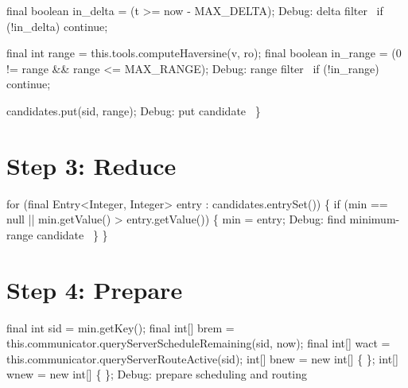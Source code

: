   final boolean in_delta = (t >= now - MAX_DELTA);
  \LA{}Debug: delta filter~{\nwtagstyle{}}\RA{}
  if (!in_delta)
    continue;

  final int range = this.tools.computeHaversine(v, ro);
  final boolean in_range = (0 != range && range <= MAX_RANGE);
  \LA{}Debug: range filter~{\nwtagstyle{}}\RA{}
  if (!in_range)
    continue;

  candidates.put(sid, range);
  \LA{}Debug: put candidate~{\nwtagstyle{}}\RA{}
\}
\nwendcode{}\nwdocspar

\section{Step 3: Reduce}

\nwenddocs{}\endmoddef\nwstartdeflinemarkup{}\nwenddeflinemarkup
for (final Entry<Integer, Integer> entry : candidates.entrySet()) \{
  if (min == null || min.getValue() > entry.getValue()) \{
    min = entry;
    \LA{}Debug: find minimum-range candidate~{\nwtagstyle{}}\RA{}
  \}
\}
\nwendcode{}\nwdocspar

\section{Step 4: Prepare}

\nwenddocs{}\endmoddef\nwstartdeflinemarkup{}\nwenddeflinemarkup
final int sid = min.getKey();
final int[] brem = this.communicator.queryServerScheduleRemaining(sid, now);
final int[] wact = this.communicator.queryServerRouteActive(sid);
int[] bnew = new int[] \{ \};
int[] wnew = new int[] \{ \};
\LA{}Debug: prepare scheduling and routing~{\nwtagstyle{}}\RA{}
\nwendcode{}\nwdocspar

